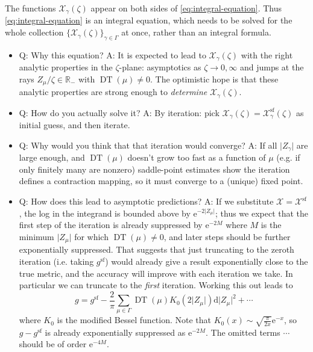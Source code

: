\documentclass[12pt,letterpaper,reqno]{article}
\numberwithin{equation}{section}
\newcommand{\cX}{\ensuremath{\mathcal X}}
\newcommand{\R}{\ensuremath{\mathbb R}}
\newcommand{\e}{{\mathrm e}}
\newcommand{\de}{\mathrm{d}}
\renewcommand{\sf}{\mathrm{sf}}
\newcommand{\abs}[1]{\lvert#1\rvert}
\newcommand{\ti}[1]{\textit{#1}}
\DeclareMathOperator{\DT}{DT}
\begin{document}
The functions $\cX_\gamma(\zeta)$ appear on both sides of
\eqref{eq:integral-equation}. Thus \eqref{eq:integral-equation} is an integral equation, which needs to be solved for 
the whole collection $\{\cX_\gamma(\zeta)\}_{\gamma \in \Gamma}$
at once, rather than an integral formula.

\begin{itemize}
  \item Q: Why this equation? A: It is expected to lead to $\cX_\gamma(\zeta)$ with
  the right analytic properties in the $\zeta$-plane: asymptotics as $\zeta \to 0,\infty$
  and jumps at the rays $Z_\mu / \zeta \in \R_-$ with $\DT(\mu) \neq 0$.
  The optimistic hope is that these analytic properties are strong enough
  to \ti{determine} $\cX_\gamma(\zeta)$.

  \item Q: How do you actually solve it? A: By iteration: pick
  $\cX_\gamma(\zeta) = \cX_\gamma^\sf(\zeta)$ as initial guess, 
  and then iterate.

  \item Q: Why would you think that that iteration would converge?
  A: If all $\abs{Z_\gamma}$ are large enough, and $\DT(\mu)$ doesn't grow too fast
  as a function of $\mu$ (e.g. if only finitely many are nonzero)
  saddle-point estimates show 
  the iteration defines a contraction mapping, so it must
  converge to a (unique) fixed point.

  \item Q: How does this lead to asymptotic predictions? A: 
  If we substitute $\cX = \cX^\sf$, the log in the
  integrand is bounded above by $\e^{-2 \abs{Z_\mu}}$;
  thus we expect that the first step of the iteration is already
  suppressed by $\e^{-2 M}$ where $M$ is the minimum $\abs{Z_\mu}$
  for which $\DT(\mu) \neq 0$, and later steps
  should be further exponentially suppressed. That suggests
  that just truncating to the zeroth iteration (i.e. taking $g^\sf$)
  would already give a result exponentially close to the true metric,
  and the accuracy will improve with each iteration we take.
  In particular we can truncate to the \ti{first} iteration.
  Working this out leads to
  \begin{equation}
    g = g^\sf - \frac{2}{\pi} \sum_{\mu \in \Gamma} \DT(\mu) K_0\left( 2 \abs{Z_\mu} \right) \de \abs{Z_\mu}^2 + \cdots
  \end{equation}
  where $K_0$ is the modified Bessel function.
  Note that $K_0(x) \sim \sqrt{\frac{\pi}{2x}} \e^{-x}$,
  so $g - g^\sf$ is already exponentially suppressed as $\e^{-2M}$.
  The omitted terms $\cdots$ should be of order $\e^{-4M}$.
\end{itemize}
\end{document}
